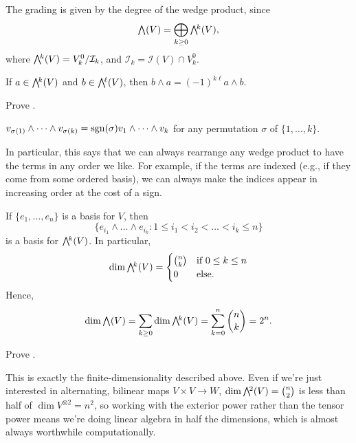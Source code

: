 The grading is given by the degree of the wedge product, since
\[
	\ext{}(V) = \bigoplus_{k \geq 0} \ext{k}(V),
\]
where $\ext{k}(V) = V_k^0/\mathcal{I}_k$, and $\mathcal{I}_k = \mathcal{I}(V) \cap V_k^0$.

\begin{proposition}\label{prop:wedge product graded commutative}
	If $a \in \ext{k}(V)$ and $b \in \ext{\ell}(V)$, then $b \wedge a = (-1)^{k\ell} a \wedge b$.
\end{proposition}

\begin{exercise}
	Prove .
\end{exercise}

\begin{corollary}\label{cor:wedge product alternating}
	$v_{\sigma(1)} \wedge \dots \wedge v_{\sigma(k)} = \operatorname{sgn}(\sigma) v_1 \wedge \dots \wedge v_k$ for any permutation $\sigma$ of $\{1,\dots, k\}$.
\end{corollary}

In particular, this says that we can always rearrange any wedge product to have the terms in any order we like. For example, if the terms are indexed (e.g., if they come from some ordered basis), we can always make the indices appear in increasing order at the cost of a sign.

\begin{proposition}\label{prop:exterior power basis}
	If $\{e_1, \dots, e_n\}$ is a basis for $V$, then 
	\[
		\{e_{i_1} \wedge \dots \wedge e_{i_k} : 1 \leq i_1 < i_2 < \dots < i_k \leq n\}
	\]
	is a basis for $\ext{k}(V)$. In particular,
	\[
		\dim \ext{k}(V) = \begin{cases} \binom{n}{k} & \text{if } 0 \leq k \leq n \\ 0 & \text{else.}\end{cases}
	\]
	Hence,
	\[
		\dim \ext{}(V) = \sum_{k \geq 0} \dim \ext{k}(V) = \sum_{k=0}^n \binom{n}{k} = 2^n.
	\]	
\end{proposition}

\begin{exercise}
	Prove .
\end{exercise}

This is exactly the finite-dimensionality described above. Even if we're just interested in alternating, bilinear maps $V \times V \to W$, $\dim \ext{2}(V) = \binom{n}{2}$ is less than half of $\dim V^{\otimes 2} = n^2$, so working with the exterior power rather than the tensor power means we're doing linear algebra in half the dimensions, which is almost always worthwhile computationally.

